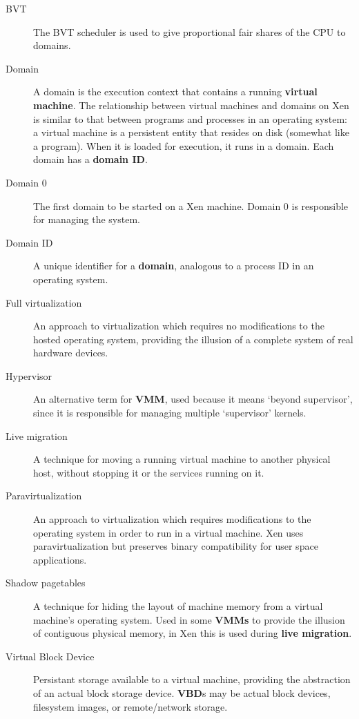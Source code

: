 \documentclass[11pt,twoside,final,openright]{report}
\begin{document}
\begin{description}

\item[BVT] The BVT scheduler is used to give proportional fair shares
  of the CPU to domains.

\item[Domain] A domain is the execution context that contains a
  running {\bf virtual machine}.  The relationship between virtual
  machines and domains on Xen is similar to that between programs and
  processes in an operating system: a virtual machine is a persistent
  entity that resides on disk (somewhat like a program).  When it is
  loaded for execution, it runs in a domain.  Each domain has a {\bf
    domain ID}.

\item[Domain 0] The first domain to be started on a Xen machine.
  Domain 0 is responsible for managing the system.

\item[Domain ID] A unique identifier for a {\bf domain}, analogous to
  a process ID in an operating system.

\item[Full virtualization] An approach to virtualization which
  requires no modifications to the hosted operating system, providing
  the illusion of a complete system of real hardware devices.

\item[Hypervisor] An alternative term for {\bf VMM}, used because it
  means `beyond supervisor', since it is responsible for managing
  multiple `supervisor' kernels.

\item[Live migration] A technique for moving a running virtual machine
  to another physical host, without stopping it or the services
  running on it.

\item[Paravirtualization] An approach to virtualization which requires
  modifications to the operating system in order to run in a virtual
  machine.  Xen uses paravirtualization but preserves binary
  compatibility for user space applications.

\item[Shadow pagetables] A technique for hiding the layout of machine
  memory from a virtual machine's operating system.  Used in some {\bf
  VMMs} to provide the illusion of contiguous physical memory, in
  Xen this is used during {\bf live migration}.

\item[Virtual Block Device] Persistant storage available to a virtual
  machine, providing the abstraction of an actual block storage device.
  {\bf VBD}s may be actual block devices, filesystem images, or
  remote/network storage.


\end{description}
\end{document}

